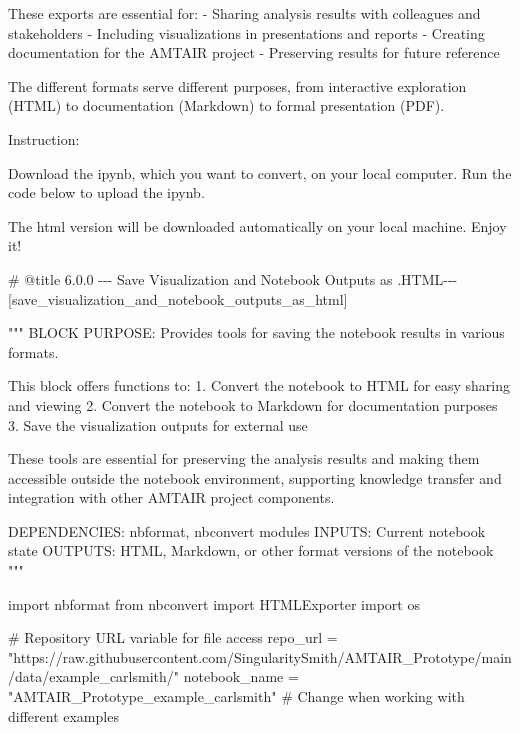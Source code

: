 \documentclass[
  11pt,
  letterpaper,
]{book}
\newenvironment{Shaded}{\begin{snugshade}}{\end{snugshade}}
\newcommand{\CommentTok}[1]{\textcolor[rgb]{0.37,0.37,0.37}{#1}}
\newcommand{\ImportTok}[1]{\textcolor[rgb]{0.00,0.46,0.62}{#1}}
\newcommand{\NormalTok}[1]{\textcolor[rgb]{0.00,0.23,0.31}{#1}}
\newcommand{\OperatorTok}[1]{\textcolor[rgb]{0.37,0.37,0.37}{#1}}
\newcommand{\StringTok}[1]{\textcolor[rgb]{0.13,0.47,0.30}{#1}}
\begin{document}
These exports are essential for: - Sharing analysis results with
colleagues and stakeholders - Including visualizations in presentations
and reports - Creating documentation for the AMTAIR project - Preserving
results for future reference

The different formats serve different purposes, from interactive
exploration (HTML) to documentation (Markdown) to formal presentation
(PDF).

Instruction:

Download the ipynb, which you want to convert, on your local computer.
Run the code below to upload the ipynb.

The html version will be downloaded automatically on your local machine.
Enjoy it!

\label{save_visualization_and_notebook_outputs_as_html}
\begin{Shaded}
\begin{Highlighting}[]
\CommentTok{\# @title 6.0.0 {-}{-}{-} Save Visualization and Notebook Outputs as .HTML{-}{-}{-} [save\_visualization\_and\_notebook\_outputs\_as\_html]}

\CommentTok{"""}
\CommentTok{BLOCK PURPOSE: Provides tools for saving the notebook results in various formats.}

\CommentTok{This block offers functions to:}
\CommentTok{1. Convert the notebook to HTML for easy sharing and viewing}
\CommentTok{2. Convert the notebook to Markdown for documentation purposes}
\CommentTok{3. Save the visualization outputs for external use}

\CommentTok{These tools are essential for preserving the analysis results and making them}
\CommentTok{accessible outside the notebook environment, supporting knowledge transfer}
\CommentTok{and integration with other AMTAIR project components.}

\CommentTok{DEPENDENCIES: nbformat, nbconvert modules}
\CommentTok{INPUTS: Current notebook state}
\CommentTok{OUTPUTS: HTML, Markdown, or other format versions of the notebook}
\CommentTok{"""}

\ImportTok{import}\NormalTok{ nbformat}
\ImportTok{from}\NormalTok{ nbconvert }\ImportTok{import}\NormalTok{ HTMLExporter}
\ImportTok{import}\NormalTok{ os}

\CommentTok{\# Repository URL variable for file access}
\NormalTok{repo\_url }\OperatorTok{=} \StringTok{"https://raw.githubusercontent.com/SingularitySmith/AMTAIR\_Prototype/main/data/example\_carlsmith/"}
\NormalTok{notebook\_name }\OperatorTok{=} \StringTok{"AMTAIR\_Prototype\_example\_carlsmith"}  \CommentTok{\# Change when working with different examples}


\end{Highlighting}
\end{Shaded}
\end{document}
